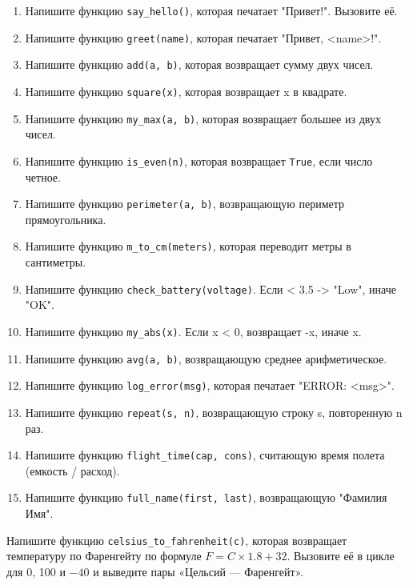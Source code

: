 \begin{enumerate}
    \item Напишите функцию \texttt{say\_hello()}, которая печатает "Привет!". Вызовите её.
    \item Напишите функцию \texttt{greet(name)}, которая печатает "Привет, <name>!".
    \item Напишите функцию \texttt{add(a, b)}, которая возвращает сумму двух чисел.
    \item Напишите функцию \texttt{square(x)}, которая возвращает x в квадрате.
    \item Напишите функцию \texttt{my\_max(a, b)}, которая возвращает большее из двух чисел.
    \item Напишите функцию \texttt{is\_even(n)}, которая возвращает \texttt{True}, если число четное.
    \item Напишите функцию \texttt{perimeter(a, b)}, возвращающую периметр прямоугольника.
    \item Напишите функцию \texttt{m\_to\_cm(meters)}, которая переводит метры в сантиметры.
    \item Напишите функцию \texttt{check\_battery(voltage)}. Если < 3.5 -> "Low", иначе "OK".
    \item Напишите функцию \texttt{my\_abs(x)}. Если x < 0, возвращает -x, иначе x.
    \item Напишите функцию \texttt{avg(a, b)}, возвращающую среднее арифметическое.
    \item Напишите функцию \texttt{log\_error(msg)}, которая печатает "ERROR: <msg>".
    \item Напишите функцию \texttt{repeat(s, n)}, возвращающую строку s, повторенную n раз.
    \item Напишите функцию \texttt{flight\_time(cap, cons)}, считающую время полета (емкость / расход).
    \item Напишите функцию \texttt{full\_name(first, last)}, возвращающую "Фамилия Имя".
\end{enumerate}

\begin{taskbox}[Конвертер]
Напишите функцию \texttt{celsius\_to\_fahrenheit(c)}, которая возвращает температуру по Фаренгейту по формуле $F = C \times 1.8 + 32$. Вызовите её в цикле для 0, 100 и $-40$ и выведите пары «Цельсий --- Фаренгейт».
\end{taskbox}
